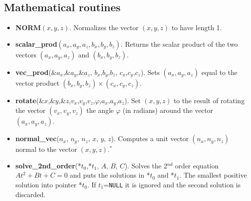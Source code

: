 \subsection{Mathematical routines}
\begin{itemize}
\item {\bfseries NORM}$(x,y,z)$. Normalizes the vector $(x,y,z)$ to have
  length 1.
\item {\bfseries scalar\_prod}$(a_x,a_y,a_z, b_x,b_y,b_z)$. Returns the scalar
  product of the two vectors $(a_x,a_y,a_z)$ and $(b_x,b_y,b_z)$.
\item {\bfseries vec\_prod}(\&$a_x$,\&$a_y$,\&$a_z$, $b_x$,$b_y$,$b_z$, $c_x$,$c_y$,$c_z$). Sets
  $(a_x,a_y,a_z)$ equal to the vector product $(b_x,b_y,b_z) \times (c_x,c_y,c_z)$.
\item {\bfseries rotate}(\&$x$,\&$y$,\&$z$,$v_x$,$v_y$,$v_z$,$\varphi$,$a_x$,$a_y$,$a_z$). Set
  $(x,y,z)$ to the result of rotating the vector $(v_x,v_y,v_z)$
  the angle $\varphi$ (in radians) around the vector $(a_x,a_y,a_z)$.
\item {\bfseries normal\_vec}($n_x$, $n_y$, $n_z$, $x$, $y$, $z$).
  Computes a unit vector $(n_x, n_y, n_z)$ normal to the vector
  $(x,y,z)$.$^*$
\item {\bfseries solve\_2nd\_order}(*$t_0$,*$t_1$, $A$,  $B$,  $C$).
  Solves the 2$^{nd}$ order equation $At^2 + Bt + C = 0$ and puts the solutions in
  *$t_0$ and *$t_1$. The smallest positive solution into pointer *$t_0$. If $t_1$=\texttt{NULL}
  it is ignored and the second solution is discarded.
\end{itemize}

